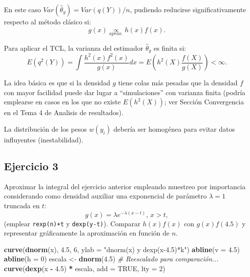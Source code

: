 \documentclass[]{book}
\newenvironment{Shaded}{\begin{snugshade}}{\end{snugshade}}
\newcommand{\KeywordTok}[1]{\textcolor[rgb]{0.13,0.29,0.53}{\textbf{#1}}}
\newcommand{\DataTypeTok}[1]{\textcolor[rgb]{0.13,0.29,0.53}{#1}}
\newcommand{\DecValTok}[1]{\textcolor[rgb]{0.00,0.00,0.81}{#1}}
\newcommand{\FloatTok}[1]{\textcolor[rgb]{0.00,0.00,0.81}{#1}}
\newcommand{\StringTok}[1]{\textcolor[rgb]{0.31,0.60,0.02}{#1}}
\newcommand{\CommentTok}[1]{\textcolor[rgb]{0.56,0.35,0.01}{\textit{#1}}}
\newcommand{\OtherTok}[1]{\textcolor[rgb]{0.56,0.35,0.01}{#1}}
\newcommand{\OperatorTok}[1]{\textcolor[rgb]{0.81,0.36,0.00}{\textbf{#1}}}
\newcommand{\NormalTok}[1]{#1}
\theoremstyle{definition}
\theoremstyle{definition}
\theoremstyle{definition}
\theoremstyle{remark}
\begin{document}
En este caso
\(Var(\hat{\theta}_{g}) = Var\left( q\left( Y\right) \right) /n\),
pudiendo reducirse significativamente respecto al método clásico si:
\[g(x)\underset{aprox.}{\propto }h\left( x\right) f(x).\]

Para aplicar el TCL, la varianza del estimador \(\hat{\theta}_{g}\) es
finita si: \[E\left( q^{2}\left( Y\right) \right)  
= \int \frac{h^{2}\left( x\right)f^{2}(x)}{g(x)}dx 
= E\left( h^{2}\left( X\right) \frac{f(X)}{g(X)}\right)
< \infty.\]

La idea básica es que si la densidad \(g\) tiene colas más pesadas que
la densidad \(f\) con mayor facilidad puede dar lugar a ``simulaciones''
con varianza finita (podría emplearse en casos en los que no existe
\(E \left( h^{2} \left( X \right) \right)\); ver Sección Convergencia en
el Tema 4 de Analisis de resultados).

La distribución de los pesos \(w(y_{i})\) debería ser homogénea para
evitar datos influyentes (inestabilidad).

\subsection{Ejercicio 3}\label{ejercicio-3}

Aproximar la integral del ejercicio anterior empleando muestreo por
importancia considerando como densidad auxiliar una exponencial de
parámetro \(\lambda=1\) truncada en \(t\):
\[g\left(  x\right)  =\lambda e^{-\lambda\left(  x-t\right)  }\text{, }x>t,\]
(emplear \texttt{rexp(n)+t} y \texttt{dexp(y-t)}). Comparar \(h(x)f(x)\)
con \(g(x)f(4.5)\) y representar gráficamente la aproximación en función
de \(n\).

\begin{Shaded}
\begin{Highlighting}[]
\KeywordTok{curve}\NormalTok{(}\KeywordTok{dnorm}\NormalTok{(x), }\FloatTok{4.5}\NormalTok{, }\DecValTok{6}\NormalTok{, }\DataTypeTok{ylab =} \StringTok{"dnorm(x) y dexp(x-4.5)*k"}\NormalTok{)}
\KeywordTok{abline}\NormalTok{(}\DataTypeTok{v =} \FloatTok{4.5}\NormalTok{)}
\KeywordTok{abline}\NormalTok{(}\DataTypeTok{h =} \DecValTok{0}\NormalTok{)}
\NormalTok{escala <-}\StringTok{ }\KeywordTok{dnorm}\NormalTok{(}\FloatTok{4.5}\NormalTok{)  }\CommentTok{# Reescalado para comparación...}
\KeywordTok{curve}\NormalTok{(}\KeywordTok{dexp}\NormalTok{(x }\OperatorTok{-}\StringTok{ }\FloatTok{4.5}\NormalTok{) }\OperatorTok{*}\StringTok{ }\NormalTok{escala, }\DataTypeTok{add =} \OtherTok{TRUE}\NormalTok{, }\DataTypeTok{lty =} \DecValTok{2}\NormalTok{)  }
\end{Highlighting}
\end{Shaded}
\end{document}
